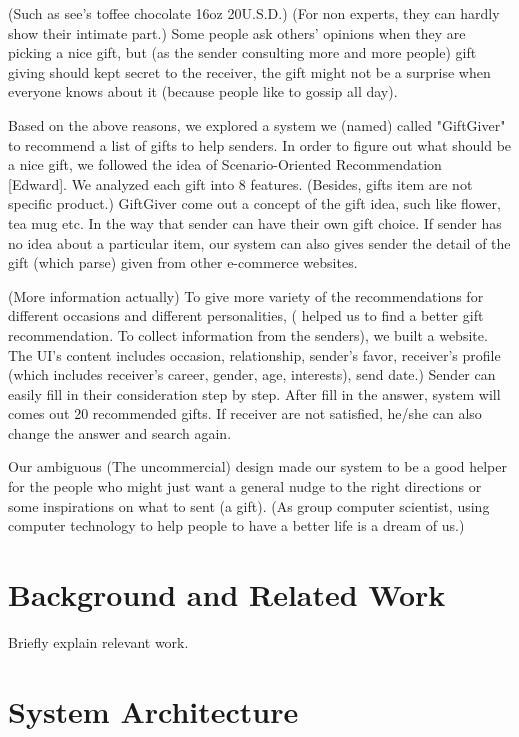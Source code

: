 \documentclass[11pt,twocolumn]{article}
\begin{document}
(Such as see’s toffee chocolate 16oz 20U.S.D.) (For non experts, they can hardly show their intimate part.)  Some people ask others' opinions when they are picking a nice gift, but (as the sender consulting more and more people) gift giving should kept secret to the receiver, the gift might not be a surprise when everyone knows about it (because people like to gossip all day).

Based on the above reasons, we explored a system we (named) called "GiftGiver" to recommend a list of gifts to help senders. In order to figure out what should be a nice gift,  we followed the idea of Scenario-Oriented Recommendation~\cite{Shen} [Edward].   We analyzed each gift into 8 features.  (Besides, gifts item are not specific product.)   GiftGiver come out a concept of the gift idea, such like flower, tea mug etc.  In the way that sender can have their own gift choice.  If sender has no idea about a particular item, our system can also gives sender the detail of the gift (which parse) given from other e-commerce websites.

(More information actually) To give more variety of the recommendations for different occasions and different personalities, ( helped us to find a better gift recommendation.   To collect information from the senders), we built a website.   The UI’s content includes occasion, relationship, sender's favor, receiver's profile (which includes receiver's career, gender, age, interests), send date.)
Sender can easily fill in their consideration step by step. 
After fill in the answer, system will comes out 20 recommended gifts.  If receiver are not satisfied, he/she can also change the answer and search again.

Our ambiguous (The uncommercial) design made our system to be a good helper for the people who might just want a general nudge to the right directions or some inspirations on what to sent (a gift).  (As group computer scientist, using computer technology to help people to have a better life is a dream of us.)


\section{Background and Related Work}

Briefly explain relevant work.

\section{System Architecture}
\end{document}
